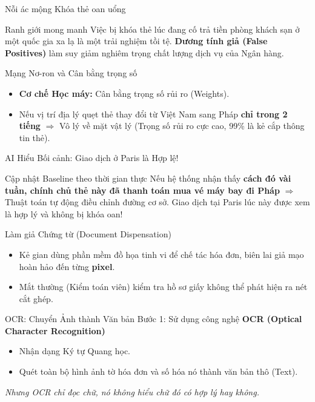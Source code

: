 \documentclass[aspectratio=169]{beamer}
\begin{document}
\begin{frame}{Nỗi ác mộng Khóa thẻ oan uổng}
    \begin{alertblock}{Ranh giới mong manh}
        Việc bị khóa thẻ lúc đang cố trả tiền phòng khách sạn ở một quốc gia xa lạ là một trải nghiệm tồi tệ. \textbf{Dương tính giả (False Positives)} làm suy giảm nghiêm trọng chất lượng dịch vụ của Ngân hàng.
    \end{alertblock}
\end{frame}

\begin{frame}{Mạng Nơ-ron và Cân bằng trọng số}
    \begin{itemize}
        \item \textbf{Cơ chế Học máy:} Cân bằng trọng số rủi ro (Weights).
        \item Nếu vị trí địa lý quẹt thẻ thay đổi từ Việt Nam sang Pháp \textbf{chỉ trong 2 tiếng} $\Rightarrow$ Vô lý về mặt vật lý (Trọng số rủi ro cực cao, 99\% là kẻ cắp thông tin thẻ).
    \end{itemize}
\end{frame}

\begin{frame}{AI Hiểu Bối cảnh: Giao dịch ở Paris là Hợp lệ!}
    \begin{exampleblock}{Cập nhật Baseline theo thời gian thực}
        Nếu hệ thống nhận thấy \textbf{cách đó vài tuần, chính chủ thẻ này đã thanh toán mua vé máy bay đi Pháp} $\Rightarrow$ Thuật toán tự động điều chỉnh đường cơ sở. Giao dịch tại Paris lúc này được xem là hợp lý và không bị khóa oan!
    \end{exampleblock}
\end{frame}

\begin{frame}{Làm giả Chứng từ (Document Dispensation)}
    \begin{itemize}
        \item Kẻ gian dùng phần mềm đồ họa tinh vi để chế tác hóa đơn, biên lai giả mạo hoàn hảo đến từng \textbf{pixel}.
        \item Mắt thường (Kiểm toán viên) kiểm tra hồ sơ giấy không thể phát hiện ra nét cắt ghép.
    \end{itemize}
\end{frame}

\begin{frame}{OCR: Chuyển Ảnh thành Văn bản}
    Bước 1: Sử dụng công nghệ \textbf{OCR (Optical Character Recognition)}
    \begin{itemize}
        \item Nhận dạng Ký tự Quang học.
        \item Quét toàn bộ hình ảnh tờ hóa đơn và số hóa nó thành văn bản thô (Text).
    \end{itemize}
    \textit{Nhưng OCR chỉ đọc chữ, nó không hiểu chữ đó có hợp lý hay không.}
\end{frame}
\end{document}

